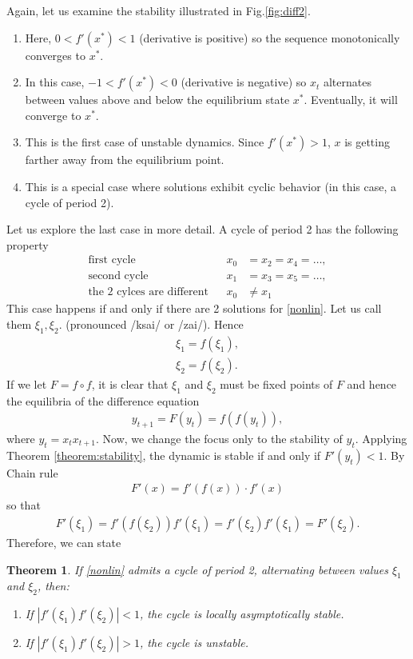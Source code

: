 \documentclass[11pt,a4paper]{book}
\newtheorem{theorem}{Theorem}[section]
\theoremstyle{definition}\newtheorem{definition}{Definition}
\theoremstyle{definition}\newtheorem{fact}{Fact}
\theoremstyle{definition}\newtheorem{remark}{Remark}
\theoremstyle{definition}\newtheorem{ex}{Ex.}
\theoremstyle{definition}\newtheorem{project}{Project}
\theoremstyle{definition}\newtheorem{problem}{Problem}
\theoremstyle{definition}\newtheorem{example}{Example}
\numberwithin{theorem}{section}
\numberwithin{corollary}{chapter}
\numberwithin{assumption}{chapter}
\numberwithin{definition}{chapter}
\numberwithin{prop}{chapter}
\numberwithin{notation}{chapter}
\numberwithin{problem}{chapter}
\numberwithin{example}{chapter}
\numberwithin{fact}{chapter}
\numberwithin{ex}{chapter}
\begin{document}
	Again, let us examine the stability illustrated in Fig.\ref{fig:diff2}. 
	\begin{enumerate}
		\item Here, $0< f'(x^*) < 1$ (derivative is positive) so the sequence monotonically converges to $x^*$.
		\item In this case, $-1 < f'(x^*) < 0$ (derivative is negative) so $x_t$ alternates between values above and below the equilibrium state $x^*$. Eventually, it will converge to $x^*$.
		\item This is the first case of unstable dynamics. Since $f'(x^*) > 1$, $x$ is getting farther away from the equilibrium point.
		\item This is a special case where solutions exhibit cyclic behavior (in this case, a cycle of period 2).
	\end{enumerate}
	
	Let us explore the last case in more detail. A cycle of period 2 has the following property
	\begin{align*}
			\text{first cycle} && x_0 &= x_2 = x_4 = \dots, \\
			\text{second cycle} &&x_1 &= x_3 = x_5 = \dots, \\
			\text{the 2 cylces are different} && x_0 &\neq x_1
	\end{align*}
	This case happens if and only if there are 2 solutions for  \eqref{nonlin}. Let us call them $\xi_1, \xi_2$. (pronounced /ksai/ or /zai/). Hence
	\begin{align*}
		\xi_1 = f(\xi_1), \\
		\xi_2 = f(\xi_2). 
	\end{align*}
	If we let $F = f \circ f$, it is clear that $\xi_1$ and $\xi_2$ must be fixed points of $F$ and hence the equilibria of the difference equation
	\begin{align*}
		y_{t+1} = F(y_t) = f(f(y_t)),
	\end{align*}
	where $y_t = x_t x_{t+1}$. Now, we change the focus only to the stability of $y_t$. Applying Theorem \ref{theorem:stability}, the dynamic is stable if and only if $F'(y_t) < 1$. By Chain rule
	\begin{align*}
		F'(x) = f' ( f(x) ) \cdot f'(x)
	\end{align*}
	so that
	\begin{align*}
		F'(\xi_1) = f' ( f(\xi_2) ) f'(\xi_1) = f'(\xi_2) f'(\xi_1)  = F'(\xi_2).
	\end{align*}
	Therefore, we can state 
	\begin{theorem}
		If \eqref{nonlin} admits a cycle of period 2, alternating between values $\xi_1$ and $\xi_2$, then:
		\begin{enumerate}
			\item If $| f'(\xi_1) f'(\xi_2) | < 1$, the cycle is locally asymptotically stable.
			\item If $| f'(\xi_1) f'(\xi_2) | > 1$, the cycle is unstable.
		\end{enumerate}
	\end{theorem}
	
\end{document}
